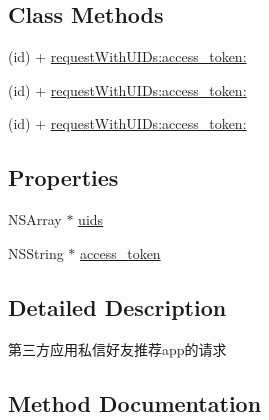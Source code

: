\subsection*{Class Methods}
\begin{DoxyCompactItemize}
\item 
(id) + \mbox{\hyperlink{interface_w_b_s_d_k_app_recommend_request_acc546a201fde3801e2aa5adc4957ca24}{request\+With\+U\+I\+Ds\+:access\+\_\+token\+:}}
\item 
(id) + \mbox{\hyperlink{interface_w_b_s_d_k_app_recommend_request_acc546a201fde3801e2aa5adc4957ca24}{request\+With\+U\+I\+Ds\+:access\+\_\+token\+:}}
\item 
(id) + \mbox{\hyperlink{interface_w_b_s_d_k_app_recommend_request_acc546a201fde3801e2aa5adc4957ca24}{request\+With\+U\+I\+Ds\+:access\+\_\+token\+:}}
\end{DoxyCompactItemize}
\subsection*{Properties}
\begin{DoxyCompactItemize}
\item 
N\+S\+Array $\ast$ \mbox{\hyperlink{interface_w_b_s_d_k_app_recommend_request_ab2619231f3b600607b5d05fdf9144fa7}{uids}}
\item 
N\+S\+String $\ast$ \mbox{\hyperlink{interface_w_b_s_d_k_app_recommend_request_a9065d56ba615131866be8145eddb448f}{access\+\_\+token}}
\end{DoxyCompactItemize}


\subsection{Detailed Description}
第三方应用私信好友推荐app的请求 

\subsection{Method Documentation}
\mbox{\label{interface_w_b_s_d_k_app_recommend_request_acc546a201fde3801e2aa5adc4957ca24}} 
